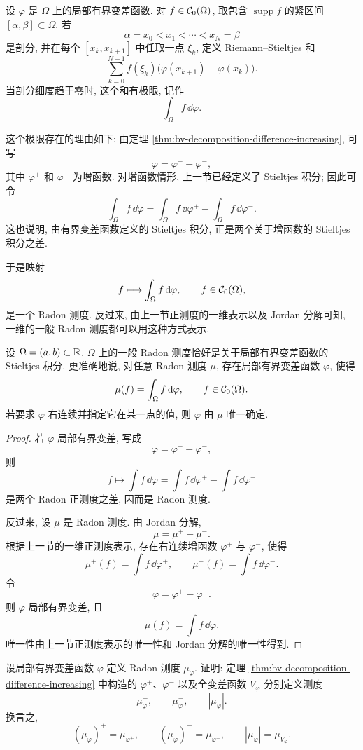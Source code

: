 设 \(\varphi\) 是 \(\Omega\) 上的局部有界变差函数. 对 \(f\in\mathcal{C}_0(\Omega)\), 取包含 \(\operatorname{supp} f\) 的紧区间 \([\alpha,\beta]\subset\Omega\). 若
\[
\alpha=x_0<x_1<\cdots<x_N=\beta
\]
是剖分, 并在每个 \([x_k,x_{k+1}]\) 中任取一点 \(\xi_k\), 定义 Riemann--Stieltjes 和
\[
\sum_{k=0}^{N-1} f(\xi_k)\bigl(\varphi(x_{k+1})-\varphi(x_k)\bigr).
\]
当剖分细度趋于零时, 这个和有极限, 记作
\[
\int_\Omega f\,\dd\varphi.
\]

这个极限存在的理由如下: 由定理 \ref{thm:bv-decomposition-difference-increasing}, 可写
\[
\varphi=\varphi^+-\varphi^-,
\]
其中 \(\varphi^+\) 和 \(\varphi^-\) 为增函数. 对增函数情形, 上一节已经定义了 Stieltjes 积分; 因此可令
\[
\int_\Omega f\,\dd\varphi
=
\int_\Omega f\,\dd\varphi^+
-
\int_\Omega f\,\dd\varphi^-.
\]
这也说明, 由有界变差函数定义的 Stieltjes 积分, 正是两个关于增函数的 Stieltjes 积分之差.

于是映射
\[
f\longmapsto \int_\Omega f\,\dd\varphi,
\qquad f\in\mathcal{C}_0(\Omega),
\]
是一个 Radon 测度. 反过来, 由上一节正测度的一维表示以及 Jordan 分解可知, 一维的一般 Radon 测度都可以用这种方式表示.

\begin{thm}\label{thm:one-dimensional-radon-measure-bv-stieltjes}
	设 \(\Omega=(a,b)\subset\mathbb{R}\). \(\Omega\) 上的一般 Radon 测度恰好是关于局部有界变差函数的 Stieltjes 积分. 更准确地说, 对任意 Radon 测度 \(\mu\), 存在局部有界变差函数 \(\varphi\), 使得
	\[
	\mu(f)=\int_\Omega f\,\dd\varphi,
	\qquad f\in\mathcal{C}_0(\Omega).
	\]
	若要求 \(\varphi\) 右连续并指定它在某一点的值, 则 \(\varphi\) 由 \(\mu\) 唯一确定.
\end{thm}

\begin{proof}
	若 \(\varphi\) 局部有界变差, 写成
	\[
	\varphi=\varphi^+-\varphi^-,
	\]
	则
	\[
	f\longmapsto \int f\,\dd\varphi
	=
	\int f\,\dd\varphi^+
	-
	\int f\,\dd\varphi^-
	\]
	是两个 Radon 正测度之差, 因而是 Radon 测度.
	
	反过来, 设 \(\mu\) 是 Radon 测度. 由 Jordan 分解,
	\[
	\mu=\mu^+-\mu^-.
	\]
	根据上一节的一维正测度表示, 存在右连续增函数 \(\varphi^+\) 与 \(\varphi^-\), 使得
	\[
	\mu^+(f)=\int f\,\dd\varphi^+,
	\qquad
	\mu^-(f)=\int f\,\dd\varphi^-.
	\]
	令
	\[
	\varphi=\varphi^+-\varphi^-.
	\]
	则 \(\varphi\) 局部有界变差, 且
	\[
	\mu(f)=\int f\,\dd\varphi.
	\]
	唯一性由上一节正测度表示的唯一性和 Jordan 分解的唯一性得到.
\end{proof}

\begin{exer}\label{exer:bv-function-positive-negative-measures}
	设局部有界变差函数 \(\varphi\) 定义 Radon 测度 \(\mu_\varphi\). 证明: 定理 \ref{thm:bv-decomposition-difference-increasing} 中构造的 \(\varphi^+\)、\(\varphi^-\) 以及全变差函数 \(V_\varphi\) 分别定义测度
	\[
	\mu_\varphi^+,
	\qquad
	\mu_\varphi^-,
	\qquad
	|\mu_\varphi|.
	\]
	换言之,
	\[
	(\mu_\varphi)^+=\mu_{\varphi^+},
	\qquad
	(\mu_\varphi)^-=\mu_{\varphi^-},
	\qquad
	|\mu_\varphi|=\mu_{V_\varphi}.
	\]
\end{exer}

